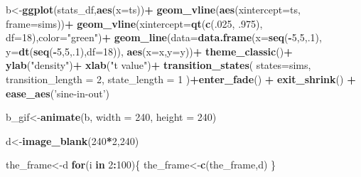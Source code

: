 \documentclass[
]{book}
\newenvironment{Shaded}{\begin{snugshade}}{\end{snugshade}}
\newcommand{\ControlFlowTok}[1]{\textcolor[rgb]{0.13,0.29,0.53}{\textbf{#1}}}
\newcommand{\DataTypeTok}[1]{\textcolor[rgb]{0.13,0.29,0.53}{#1}}
\newcommand{\DecValTok}[1]{\textcolor[rgb]{0.00,0.00,0.81}{#1}}
\newcommand{\FloatTok}[1]{\textcolor[rgb]{0.00,0.00,0.81}{#1}}
\newcommand{\KeywordTok}[1]{\textcolor[rgb]{0.13,0.29,0.53}{\textbf{#1}}}
\newcommand{\NormalTok}[1]{#1}
\newcommand{\OperatorTok}[1]{\textcolor[rgb]{0.81,0.36,0.00}{\textbf{#1}}}
\newcommand{\StringTok}[1]{\textcolor[rgb]{0.31,0.60,0.02}{#1}}
\begin{document}
\begin{Shaded}
\begin{Highlighting}[]
{{{{\NormalTok{b<-}\KeywordTok{ggplot}\NormalTok{(stats_df,}\KeywordTok{aes}\NormalTok{(}\DataTypeTok{x=}\NormalTok{ts))}\OperatorTok{+}
\StringTok{  }\KeywordTok{geom_vline}\NormalTok{(}\KeywordTok{aes}\NormalTok{(}\DataTypeTok{xintercept=}\NormalTok{ts, }\DataTypeTok{frame=}\NormalTok{sims))}\OperatorTok{+}
\StringTok{  }\KeywordTok{geom_vline}\NormalTok{(}\DataTypeTok{xintercept=}\KeywordTok{qt}\NormalTok{(}\KeywordTok{c}\NormalTok{(.}\DecValTok{025}\NormalTok{, }\FloatTok{.975}\NormalTok{), }\DataTypeTok{df=}\DecValTok{18}\NormalTok{),}\DataTypeTok{color=}\StringTok{"green"}\NormalTok{)}\OperatorTok{+}
\StringTok{  }\KeywordTok{geom_line}\NormalTok{(}\DataTypeTok{data=}\KeywordTok{data.frame}\NormalTok{(}\DataTypeTok{x=}\KeywordTok{seq}\NormalTok{(}\OperatorTok{-}\DecValTok{5}\NormalTok{,}\DecValTok{5}\NormalTok{,.}\DecValTok{1}\NormalTok{),}
                            \DataTypeTok{y=}\KeywordTok{dt}\NormalTok{(}\KeywordTok{seq}\NormalTok{(}\OperatorTok{-}\DecValTok{5}\NormalTok{,}\DecValTok{5}\NormalTok{,.}\DecValTok{1}\NormalTok{),}\DataTypeTok{df=}\DecValTok{18}\NormalTok{)),}
            \KeywordTok{aes}\NormalTok{(}\DataTypeTok{x=}\NormalTok{x,}\DataTypeTok{y=}\NormalTok{y))}\OperatorTok{+}
\StringTok{  }\KeywordTok{theme_classic}\NormalTok{()}\OperatorTok{+}
\StringTok{  }\KeywordTok{ylab}\NormalTok{(}\StringTok{"density"}\NormalTok{)}\OperatorTok{+}
\StringTok{  }\KeywordTok{xlab}\NormalTok{(}\StringTok{"t value"}\NormalTok{)}\OperatorTok{+}
\StringTok{  }\KeywordTok{transition_states}\NormalTok{(}
    \DataTypeTok{states=}\NormalTok{sims,}
    \DataTypeTok{transition_length =} \DecValTok{2}\NormalTok{,}
    \DataTypeTok{state_length =} \DecValTok{1}
\NormalTok{  )}\OperatorTok{+}\KeywordTok{enter_fade}\NormalTok{() }\OperatorTok{+}\StringTok{ }
\StringTok{  }\KeywordTok{exit_shrink}\NormalTok{() }\OperatorTok{+}
\StringTok{  }\KeywordTok{ease_aes}\NormalTok{(}\StringTok{'sine-in-out'}\NormalTok{)}

\NormalTok{b_gif<-}\KeywordTok{animate}\NormalTok{(b, }\DataTypeTok{width =} \DecValTok{240}\NormalTok{, }\DataTypeTok{height =} \DecValTok{240}\NormalTok{)}


\NormalTok{d<-}\KeywordTok{image_blank}\NormalTok{(}\DecValTok{240}\OperatorTok{*}\DecValTok{2}\NormalTok{,}\DecValTok{240}\NormalTok{)}

\NormalTok{the_frame<-d}
\ControlFlowTok{for}\NormalTok{(i }\ControlFlowTok{in} \DecValTok{2}\OperatorTok{:}\DecValTok{100}\NormalTok{)\{}
\NormalTok{  the_frame<-}\KeywordTok{c}\NormalTok{(the_frame,d)}
\NormalTok{\}}

}}}}
\end{Highlighting}
\end{Shaded}
\end{document}
